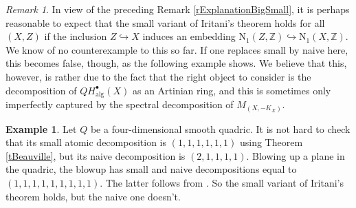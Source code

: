 \documentclass[11pt]{amsart}
\theoremstyle{plain}
\numberwithin{equation}{section}
\theoremstyle{definition}
\newtheorem{example}[theorem]{Example}
\theoremstyle{remark}
\newtheorem{remark}[theorem]{Remark}
\begin{document}
\begin{remark}\label{rSoupedUpIritani}
In view of the preceding Remark \ref{rExplanationBigSmall}, it is perhaps reasonable to expect that the small variant of Iritani's theorem holds for all $(X, Z)$ if the inclusion $Z \hookrightarrow X$  induces an embedding $\mathrm{N}_1 (Z, \mathbb{Z}) \hookrightarrow \mathrm{N}_1 (X, \mathbb{Z})$. We know of no counterexample to this so far. If one replaces small by naive here, this becomes false, though, as the following example shows. We believe that this, however, is rather due to the fact that the right object to consider is the decomposition of $QH^{\bullet}_{\mathrm{alg}} (X)$ as an Artinian ring, and this is sometimes only imperfectly captured by the spectral decomposition of $M_{(X, -K_X)}$.  
\end{remark}

\begin{example}\label{eQuadric4}
 Let $Q$ be a four-dimensional smooth quadric. It is not hard to check that its small atomic decomposition is $(1,1,1,1,1,1)$ using Theorem \ref{tBeauville}, but its naive decomposition is $(2,1,1,1,1)$. Blowing up a plane in the quadric, the blowup has small and naive decompositions equal to $(1,1,1,1,1,1,1,1,1)$. The latter follows from \cite[Thm. 4.6]{HKLS25}. So the small variant of Iritani's theorem holds, but the naive one doesn't. 
\end{example}

\end{document}
